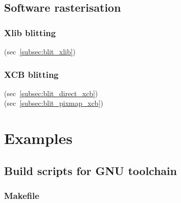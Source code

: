 \documentclass{article}
\begin{document}
\subsection{Software rasterisation}
\label{subsec:software-rasterisation}


\subsubsection{Xlib blitting}
\label{subsubsection:xlib-blitting}

(sec~\ref{subsec:blit_xlib})


\subsubsection{XCB blitting}
\label{subsubsection:xcb-blitting}

(sec~\ref{subsec:blit_direct_xcb})
\\
(sec~\ref{subsec:blit_pixmap_xcb})


\pagebreak
\section{Examples}
\label{sec:examples}


\subsection{Build scripts for GNU toolchain}
\label{subsec:build-scripts-gnu}

\subsubsection{Makefile}
\label{subsubsec:makefile}
\end{document}
